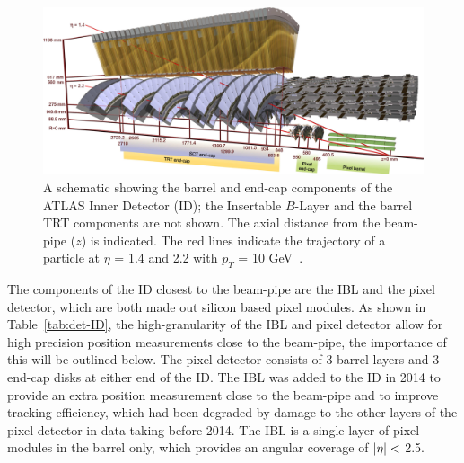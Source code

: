 \begin{figure}[!htb]
  \begin{center}
    \includegraphics[width=1\linewidth, angle=0]{figs/Detector/ID_schem.pdf}
  \end{center}
  \caption[A schematic showing the barrel and end-cap components of the ATLAS Inner Detector.]
          {A schematic showing the barrel and end-cap components of the ATLAS Inner Detector (ID);
            the Insertable $B$-Layer and the barrel TRT components are not shown.
            The axial distance from the beam-pipe ($z$) is indicated.
            The red lines indicate the trajectory of a particle at $\eta$ = 1.4 and 2.2 with $p_T$ = 10 GeV~\cite{det-ATLAS_Exp}.}
  \label{fig:det-ID_schem}
\end{figure}


\newpage
The components of the ID closest to the beam-pipe are the IBL and the pixel detector,
which are both made out silicon based pixel modules.
As shown in Table~\ref{tab:det-ID}, the high-granularity of the IBL and pixel detector allow for high precision position measurements
close to the beam-pipe, the importance of this will be outlined below.
The pixel detector consists of 3 barrel layers and 3 end-cap disks at either end of the ID.
The IBL was added to the ID in 2014 to provide an extra position measurement close to the beam-pipe
and to improve tracking efficiency,
which had been degraded by damage to the other layers of the pixel detector in data-taking before 2014.
The IBL is a single layer of pixel modules in the barrel only, which provides an angular coverage of $|\eta|\nobreak<$ 2.5.

